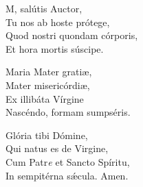 M, salútis Au\-ctor,\\
Tu nos ab hoste prótege,\\
Quod nostri quondam córporis,\\
Et hora mortis sús\-cipe.

Maria Mater gratiæ,\\
Mater misericórdiæ,\\
Ex illibáta Vírgine\\
Nascéndo, formam sum\-pséris.

Glória tibi Dómine,\\
Qui natus es de Virgine,\\
Cum Patr\textit{e} et San\-cto Spíritu,\\
In sempitérna sǽcula. Amen.